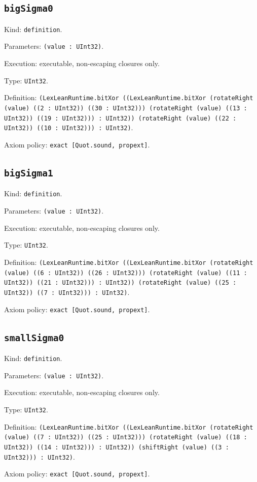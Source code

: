 \documentclass[11pt]{article}
\begin{document}
\subsection*{\texttt{bigSigma0}}
\noindent Kind: \texttt{definition}.\par
\noindent Parameters: \texttt{(value : UInt32)}.\par
\noindent Execution: executable, non-escaping closures only.\par
\noindent Type: \texttt{UInt32}.\par
\noindent Definition: \texttt{(LexLeanRuntime.bitXor ((LexLeanRuntime.bitXor (rotateRight (value) ((2 : UInt32)) ((30 : UInt32))) (rotateRight (value) ((13 : UInt32)) ((19 : UInt32))) : UInt32)) (rotateRight (value) ((22 : UInt32)) ((10 : UInt32))) : UInt32)}.\par
\noindent Axiom policy: \texttt{exact [Quot.sound, propext]}.\par
\subsection*{\texttt{bigSigma1}}
\noindent Kind: \texttt{definition}.\par
\noindent Parameters: \texttt{(value : UInt32)}.\par
\noindent Execution: executable, non-escaping closures only.\par
\noindent Type: \texttt{UInt32}.\par
\noindent Definition: \texttt{(LexLeanRuntime.bitXor ((LexLeanRuntime.bitXor (rotateRight (value) ((6 : UInt32)) ((26 : UInt32))) (rotateRight (value) ((11 : UInt32)) ((21 : UInt32))) : UInt32)) (rotateRight (value) ((25 : UInt32)) ((7 : UInt32))) : UInt32)}.\par
\noindent Axiom policy: \texttt{exact [Quot.sound, propext]}.\par
\subsection*{\texttt{smallSigma0}}
\noindent Kind: \texttt{definition}.\par
\noindent Parameters: \texttt{(value : UInt32)}.\par
\noindent Execution: executable, non-escaping closures only.\par
\noindent Type: \texttt{UInt32}.\par
\noindent Definition: \texttt{(LexLeanRuntime.bitXor ((LexLeanRuntime.bitXor (rotateRight (value) ((7 : UInt32)) ((25 : UInt32))) (rotateRight (value) ((18 : UInt32)) ((14 : UInt32))) : UInt32)) (shiftRight (value) ((3 : UInt32))) : UInt32)}.\par
\noindent Axiom policy: \texttt{exact [Quot.sound, propext]}.\par
\end{document}
